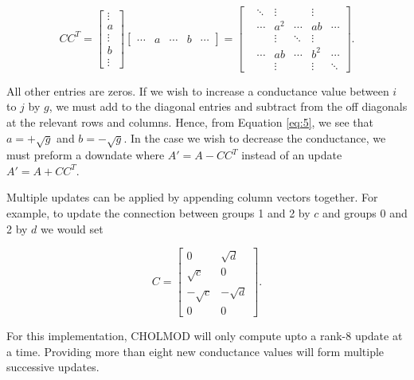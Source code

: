 \documentclass[11pt]{article}
\begin{document}
\begin{equation}\label{eq:5}
    CC^T = 
    \begin{bmatrix}
        \vdots\\
        a\\
        \vdots\\
        b\\
        \vdots
    \end{bmatrix}
    \begin{bmatrix}
        \cdots & a & \cdots & b & \cdots
    \end{bmatrix}
    =
    \begin{bmatrix}
        &\ddots& \vdots && \vdots\\
        & \cdots & a^2 & \cdots & ab & \cdots\\
        && \vdots &\ddots & \vdots\\
        &\cdots& ab & \cdots & b^2 & \cdots\\
        && \vdots && \vdots & \ddots
        
    \end{bmatrix}.
\end{equation}

All other entries are zeros. If we wish to increase a conductance value between $i$ to $j$ by $g$, we must add to the diagonal entries and subtract from the off diagonals at the relevant rows and columns. Hence, from Equation \ref{eq:5}, we see that $a = +\sqrt{g}$ and $b = -\sqrt{g}$. In the case we wish to decrease the conductance, we must preform a downdate where $A'=A-CC^T$ instead of an update $A'=A+CC^T$.

Multiple updates can be applied by appending column vectors together. For example, to update the connection between groups 1 and 2 by $c$ and groups 0 and 2 by $d$ we would set

\begin{equation}\label{eq:5}
    C = 
    \begin{bmatrix}
        0 & \sqrt{d}\\
        \sqrt{c} & 0\\
        -\sqrt{c} & -\sqrt{d}\\
        0 & 0
    \end{bmatrix}.
\end{equation}

For this implementation, CHOLMOD will only compute upto a rank-8 update at a time. Providing more than eight new conductance values will form multiple successive updates.
\end{document}
